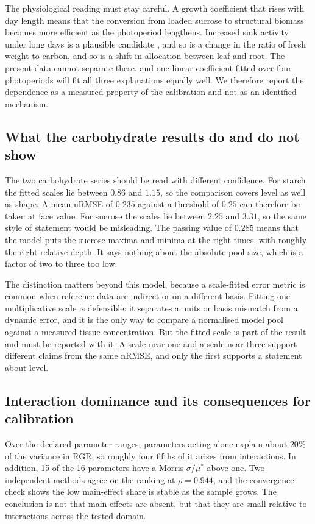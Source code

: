 The physiological reading must stay careful. A growth coefficient that rises
with day length means that the conversion from loaded sucrose to structural
biomass becomes more efficient as the photoperiod lengthens. Increased sink
activity under long days is a plausible candidate \citep{Smith2007,Sulpice2014},
and so is a change in the ratio of fresh weight to carbon, and so is a shift in
allocation between leaf and root. The present data cannot separate these, and
one linear coefficient fitted over four photoperiods will fit all three
explanations equally well. We therefore report the dependence as a measured
property of the calibration and not as an identified mechanism.

\subsection{What the carbohydrate results do and do not show}

The two carbohydrate series should be read with different confidence. For starch
the fitted scales lie between $0.86$ and $1.15$, so the comparison covers level
as well as shape. A mean nRMSE of $0.235$ against a threshold of $0.25$ can
therefore be taken at face value. For sucrose the scales lie between $2.25$ and $3.31$, so
the same style of statement would be misleading. The passing value of $0.285$
means that the model puts the sucrose maxima and minima at the right times, with
roughly the right relative depth. It says nothing about the absolute pool size,
which is a factor of two to three too low.

The distinction matters beyond this model, because a scale-fitted error metric
is common when reference data are indirect or on a different basis. Fitting one
multiplicative scale is defensible: it separates a units or basis mismatch from a
dynamic error, and it is the only way to compare a normalised model pool against
a measured tissue concentration. But the fitted scale is part of the result and
must be reported with it. A scale near one and a scale near three support
different claims from the same nRMSE, and only the first supports a statement
about level.

\subsection{Interaction dominance and its consequences for calibration}

Over the declared parameter ranges, parameters acting alone explain about
$20\%$ of the variance in RGR, so roughly four fifths of it arises from
interactions. In addition, 15 of the 16 parameters have a Morris
$\sigma/\mu^{*}$ above one. Two independent methods
agree on the ranking at $\rho = 0.944$, and the convergence check shows the low
main-effect share is stable as the sample grows. The
conclusion is not that main effects are absent, but that they are small
relative to interactions across the tested domain.


